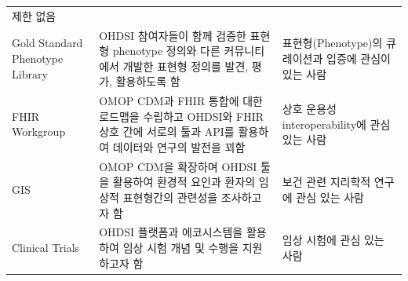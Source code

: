 \documentclass[10.5pt]{book}
\theoremstyle{definition}
\theoremstyle{definition}
\theoremstyle{definition}
\theoremstyle{remark}
\begin{document}
\begin{longtable}[]{@{}lll@{}}
\begin{minipage}[t]{0.37\columnwidth}
제한 없음\strut
\end{minipage}\tabularnewline
\begin{minipage}[t]{0.11\columnwidth}\raggedright\strut
Gold Standard Phenotype Library\strut
\end{minipage} & \begin{minipage}[t]{0.44\columnwidth}\raggedright\strut
OHDSI 참여자들이 함께 검증한 표현형 phenotype 정의와 다른 커뮤니티에서
개발한 표현형 정의를 발견, 평가, 활용하도록 함\strut
\end{minipage} & \begin{minipage}[t]{0.37\columnwidth}\raggedright\strut
표현형(Phenotype)의 큐레이션과 입증에 관심이 있는 사람\strut
\end{minipage}\tabularnewline
\begin{minipage}[t]{0.11\columnwidth}\raggedright\strut
FHIR Workgroup\strut
\end{minipage} & \begin{minipage}[t]{0.44\columnwidth}\raggedright\strut
OMOP CDM과 FHIR 통합에 대한 로드맵을 수립하고 OHDSI와 FHIR 상호 간에
서로의 툴과 API를 활용하여 데이터와 연구의 발전을 꾀함\strut
\end{minipage} & \begin{minipage}[t]{0.37\columnwidth}\raggedright\strut
상호 운용성 interoperability에 관심 있는 사람\strut
\end{minipage}\tabularnewline
\begin{minipage}[t]{0.11\columnwidth}\raggedright\strut
GIS\strut
\end{minipage} & \begin{minipage}[t]{0.44\columnwidth}\raggedright\strut
OMOP CDM을 확장하며 OHDSI 툴을 활용하여 환경적 요인과 환자의 임상적
표현형간의 관련성을 조사하고자 함\strut
\end{minipage} & \begin{minipage}[t]{0.37\columnwidth}\raggedright\strut
보건 관련 지리학적 연구에 관심 있는 사람\strut
\end{minipage}\tabularnewline
\begin{minipage}[t]{0.11\columnwidth}\raggedright\strut
Clinical Trials\strut
\end{minipage} & \begin{minipage}[t]{0.44\columnwidth}\raggedright\strut
OHDSI 플랫폼과 에코시스템을 활용하여 임상 시험 개념 및 수행을 지원하고자
함\strut
\end{minipage} & \begin{minipage}[t]{0.37\columnwidth}\raggedright\strut
임상 시험에 관심 있는 사람\strut

\end{minipage}
\end{longtable}
\end{document}
